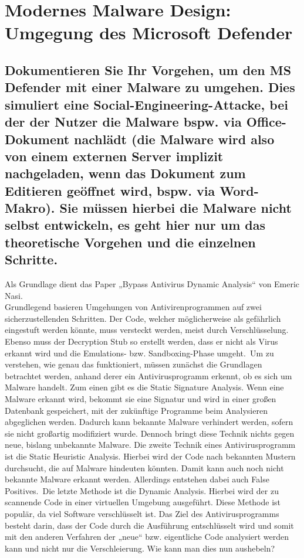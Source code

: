 \section{Modernes Malware Design: Umgegung des Microsoft Defender}
\subsection*{Dokumentieren Sie Ihr Vorgehen, um den MS Defender mit einer Malware zu umgehen. Dies simuliert eine Social-Engineering-Attacke, bei der der Nutzer die Malware bspw. via Office-Dokument nachlädt (die Malware wird also von einem externen Server implizit nachgeladen, wenn das Dokument zum Editieren geöffnet wird, bspw. via Word-Makro). Sie müssen hierbei die Malware nicht selbst entwickeln, es geht hier nur um das theoretische Vorgehen und die einzelnen Schritte.}
Als Grundlage dient das Paper „Bypass Antivirus Dynamic Analysis“ von Emeric Nasi.\\
Grundlegend basieren Umgehungen von Antivirenprogrammen auf zwei sicherzustellenden Schritten. Der Code, welcher möglicherweise als gefährlich eingestuft werden könnte, muss versteckt werden, meist durch Verschlüsselung.\\
Ebenso muss der Decryption Stub so erstellt werden, dass er nicht als Virus erkannt wird und die Emulations- bzw. Sandboxing-Phase umgeht.\
Um zu verstehen, wie genau das funktioniert, müssen zunächst die Grundlagen betrachtet werden, anhand derer ein Antivirusprogramm erkennt, ob es sich um Malware handelt. Zum einen gibt es die Static Signature Analysis. Wenn eine Malware erkannt wird, bekommt sie eine Signatur und wird in einer großen Datenbank gespeichert, mit der zukünftige Programme beim Analysieren abgeglichen werden. Dadurch kann bekannte Malware verhindert werden, sofern sie nicht großartig modifiziert wurde. Dennoch bringt diese Technik nichts gegen neue, bislang unbekannte Malware. Die zweite Technik eines Antivirusprogramm ist die Static Heuristic Analysis. Hierbei wird der Code nach bekannten Mustern durchsucht, die auf Malware hindeuten könnten. Damit kann auch noch nicht bekannte Malware erkannt werden. Allerdings entstehen dabei auch False Positives.\
Die letzte Methode ist die Dynamic Analysis. Hierbei wird der zu scannende Code in einer virtuellen Umgebung ausgeführt. Diese Methode ist populär, da viel Software verschlüsselt ist. Das Ziel des Antivirusprogramms besteht darin, dass der Code durch die Ausführung entschlüsselt wird und somit mit den anderen Verfahren der „neue“ bzw. eigentliche Code analysiert werden kann und nicht nur die Verschleierung. Wie kann man dies nun aushebeln?\\
